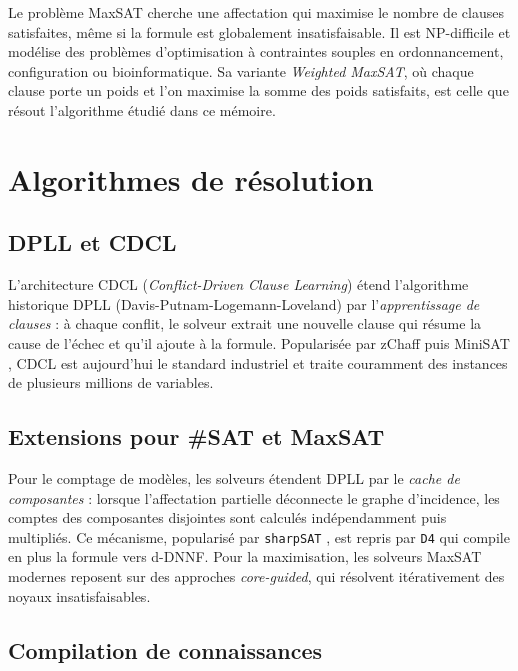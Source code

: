 \documentclass[11pt,a4paper]{report}
\theoremstyle{plain}
\theoremstyle{definition}
\begin{document}
Le problème MaxSAT cherche une affectation qui maximise le nombre de clauses
satisfaites, même si la formule est globalement insatisfaisable. Il est
NP-difficile et modélise des problèmes d'optimisation à contraintes souples
en ordonnancement, configuration ou bioinformatique. Sa variante \emph{Weighted
MaxSAT}, où chaque clause porte un poids et l'on maximise la somme des poids
satisfaits, est celle que résout l'algorithme étudié dans ce mémoire.

\section{Algorithmes de résolution}
\label{sec:algos}

\subsection{DPLL et CDCL}
\label{sec:cdcl}

L'architecture CDCL (\emph{Conflict-Driven Clause Learning}) étend
l'algorithme historique DPLL (Davis-Putnam-Logemann-Loveland) par
l'\emph{apprentissage de clauses} : à chaque conflit, le solveur extrait
une nouvelle clause qui résume la cause de l'échec et qu'il ajoute à la
formule. Popularisée par zChaff \cite{moskewicz2001} puis MiniSAT
\cite{een2003}, CDCL est aujourd'hui le standard industriel et traite
couramment des instances de plusieurs millions de variables.

\subsection{Extensions pour \#SAT et MaxSAT}

Pour le comptage de modèles, les solveurs étendent DPLL par le \emph{cache
de composantes} : lorsque l'affectation partielle déconnecte le graphe
d'incidence, les comptes des composantes disjointes sont calculés
indépendamment puis multipliés. Ce mécanisme, popularisé par
\texttt{sharpSAT} \cite{thurley2006}, est repris par \texttt{D4}
\cite{lagniez2017} qui compile en plus la formule vers d-DNNF.
Pour la maximisation, les solveurs MaxSAT modernes reposent sur des
approches \emph{core-guided}, qui résolvent itérativement des noyaux
insatisfaisables.

\subsection{Compilation de connaissances}
\end{document}
